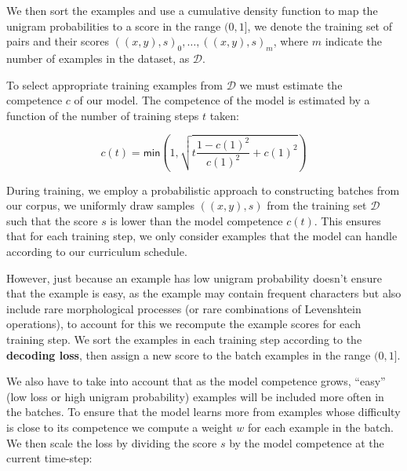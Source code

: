 \documentclass[11pt,a4paper]{article}
\begin{document}
We then sort the examples and use a cumulative density function to map
the unigram probabilities to a score in the range $(0, 1]$, we denote
the training set of pairs and their scores
$((x,y), s)_0, \ldots, ((x,y), s)_m$, where $m$ indicate the number of
examples in the dataset, as $\mathcal{D}$.

% 
%
To select appropriate training examples from $\mathcal{D}$ we must
estimate the competence $c$ of our model. The competence of the model
is estimated by a function of the number of training steps $t$ taken:



\begin{equation}
    c(t) = \mathsf{min}(1, \sqrt{t\frac{1-c(1)^2}{c(1)^2}+c(1)^2})
\end{equation}

During training, we employ a probabilistic approach to constructing
batches from our corpus, we uniformly draw samples $((x, y), s)$ from
the training set $\mathcal{D}$ such that the score $s$ is lower than
the model competence $c(t)$. This ensures that for each training
step, we only consider examples that the model can handle according
to our curriculum schedule.

However, just because an example has low unigram probability doesn't
ensure that the example is easy, as the example may contain frequent
characters but also include rare morphological processes (or rare
combinations of Levenshtein operations), to account for this we
recompute the example scores for each training step. We sort the
examples in each training step according to the \textbf{decoding
loss}, then assign a new score to the batch examples in the range
$(0, 1]$.

We also have to take into account that as the model competence grows,
``easy'' (low loss or high unigram probability) examples will be
included more often in the batches. To ensure that the model learns
more from examples whose difficulty is close to its competence we
compute a weight $w$ for each example in the batch. We then scale the
loss by dividing the score $s$ by the model competence at the current
time-step:
\end{document}

